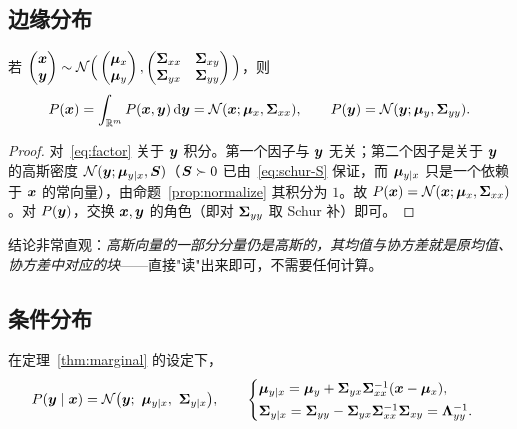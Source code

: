 \subsection{边缘分布}

\begin{theorem}[边缘分布]\label{thm:marginal}
若 $\begin{pmatrix}\bm{x}\\ \bm{y}\end{pmatrix}\sim\mathcal{N}\Big(\begin{pmatrix}\bm{\mu}_x\\ \bm{\mu}_y\end{pmatrix},\begin{pmatrix}\bm{\Sigma}_{xx}&\bm{\Sigma}_{xy}\\ \bm{\Sigma}_{yx}&\bm{\Sigma}_{yy}\end{pmatrix}\Big)$，则
\[
P(\bm{x})=\int_{\mathbb{R}^m}P(\bm{x},\bm{y})\,\mathrm{d}\bm{y}=\mathcal{N}(\bm{x};\bm{\mu}_x,\bm{\Sigma}_{xx}),\qquad
P(\bm{y})=\mathcal{N}(\bm{y};\bm{\mu}_y,\bm{\Sigma}_{yy}).
\]
\end{theorem}

\begin{proof}
对~\eqref{eq:factor} 关于 $\bm{y}$ 积分。第一个因子与 $\bm{y}$ 无关；第二个因子是关于 $\bm{y}$ 的高斯密度 $\mathcal{N}(\bm{y};\bm{\mu}_{y|x},\bm{S})$（$\bm{S}\succ 0$ 已由~\eqref{eq:schur-S} 保证，而 $\bm{\mu}_{y|x}$ 只是一个依赖于 $\bm{x}$ 的常向量），由命题~\ref{prop:normalize} 其积分为 $1$。故 $P(\bm{x})=\mathcal{N}(\bm{x};\bm{\mu}_x,\bm{\Sigma}_{xx})$。对 $P(\bm{y})$，交换 $\bm{x},\bm{y}$ 的角色（即对 $\bm{\Sigma}_{yy}$ 取 Schur 补）即可。
\end{proof}

结论非常直观：\emph{高斯向量的一部分分量仍是高斯的，其均值与协方差就是原均值、协方差中对应的块}——直接"读"出来即可，不需要任何计算。

\subsection{条件分布}

\begin{theorem}[条件分布]\label{thm:conditional}
在定理~\ref{thm:marginal} 的设定下，
\begin{equation}\label{eq:conditional}
P(\bm{y}\mid\bm{x})=\mathcal{N}\big(\bm{y};\ \bm{\mu}_{y|x},\ \bm{\Sigma}_{y|x}\big),\qquad
\begin{cases}
\bm{\mu}_{y|x}=\bm{\mu}_y+\bm{\Sigma}_{yx}\bm{\Sigma}_{xx}^{-1}(\bm{x}-\bm{\mu}_x),\\[2pt]
\bm{\Sigma}_{y|x}=\bm{\Sigma}_{yy}-\bm{\Sigma}_{yx}\bm{\Sigma}_{xx}^{-1}\bm{\Sigma}_{xy}=\bm{\Lambda}_{yy}^{-1}.
\end{cases}
\end{equation}
\end{theorem}


